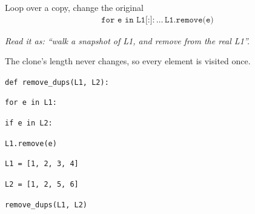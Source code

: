 \documentclass[11pt]{article}
\begin{document}
\begin{keepsection}
\begin{equationcard}{Loop over a copy, change the original}
\[ \begin{gathered} \texttt{for e in L1[:]:}\, …\, \texttt{L1.remove(e)} \end{gathered} \]
{\small \emph{Read it as: “walk a snapshot of L1, and remove from the real L1”.}\par  The clone’s length never changes, so every element is visited once.}
\end{equationcard}
\begin{tcolorbox}[colback=Paperblue,colframe=Paperblue,boxrule=0pt,arc=0pt,left=7pt,right=7pt,top=5pt,bottom=5pt]\small\sloppy
\noindent\hspace*{0em}\texttt{def remove\_dups(L1, L2):}\par
\noindent\hspace*{1em}\texttt{for e in L1:}\par
\noindent\hspace*{3em}\texttt{if e in L2:}\par
\noindent\hspace*{5em}\texttt{L1.remove(e)}\par
\noindent\hspace*{0em}\texttt{}\par
\noindent\hspace*{0em}\texttt{L1 = [1, 2, 3, 4]}\par
\noindent\hspace*{0em}\texttt{L2 = [1, 2, 5, 6]}\par
\noindent\hspace*{0em}\texttt{remove\_dups(L1, L2)}\par
\end{tcolorbox}


\end{keepsection}
\end{document}

